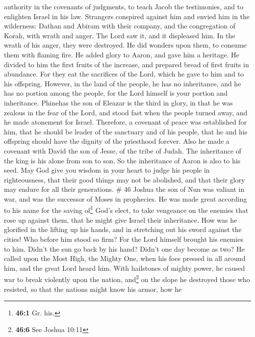authority in the covenants of judgments, to teach Jacob the testimonies,
and to enlighten Israel in his law.  Strangers conspired
against him and envied him in the wilderness: Dathan and Abiram with
their company, and the congregation of Korah, with wrath and anger.
 The Lord saw it, and it displeased him. In the wrath of
his anger, they were destroyed. He did wonders upon them, to consume
them with flaming fire.  He added glory to Aaron, and
gave him a heritage. He divided to him the first fruits of the increase,
and prepared bread of first fruits in abundance.  For
they eat the sacrifices of the Lord, which he gave to him and to his
offspring.  However, in the land of the people, he has no
inheritance, and he has no portion among the people, for the Lord
himself is your portion and inheritance.  Phinehas the
son of Eleazar is the third in glory, in that he was zealous in the fear
of the Lord, and stood fast when the people turned away, and he made
atonement for Israel.  Therefore, a covenant of peace was
established for him, that he should be leader of the sanctuary and of
his people, that he and his offspring should have the dignity of the
priesthood forever.  Also he made a covenant with David
the son of Jesse, of the tribe of Judah. The inheritance of the king is
his alone from son to son. So the inheritance of Aaron is also to his
seed.  May God give you wisdom in your heart to judge his
people in righteousness, that their good things may not be abolished,
and that their glory may endure for all their generations. \# 46
 Joshua the son of Nun was valiant in war, and was the
successor of Moses in prophecies. He was made great according to his
name for the saving of\footnote{\textbf{46:1} Gr. his.} God's elect, to
take vengeance on the enemies that rose up against them, that he might
give Israel their inheritance.  How was he glorified in
the lifting up his hands, and in stretching out his sword against the
cities!  Who before him stood so firm? For the Lord
himself brought his enemies to him.  Didn't the sun go
back by his hand? Didn't one day become as two?  He called
upon the Most High, the Mighty One, when his foes pressed in all around
him, and the great Lord heard him.  With hailstones of
mighty power, he caused war to break violently upon the nation,
and\footnote{\textbf{46:6} See Joshua 10:11} on the slope he destroyed
those who resisted, so that the nations might know his armor, how he
